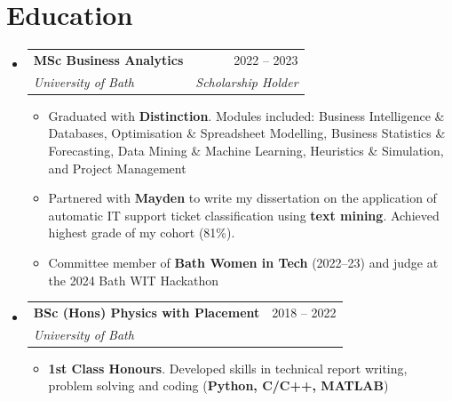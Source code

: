 \documentclass[a4paper,10pt]{article}
\makeatletter
\newcommand{\resumeItem}[1]{
  \item\small{#1}
}
\newcommand{\resumeItemListStart}{\begin{itemize}[rightmargin=0.11in, itemsep=2pt]}
\newcommand{\resumeItemListEnd}{\end{itemize}}
\newcommand{\resumeTrioHeading}[3]{
  \item\small{
    \begin{tabular*}{0.96\textwidth}[t]{
      l@{\extracolsep{\fill}}c@{\extracolsep{\fill}}r
    }
      \textbf{#1} & \textit{#2} & #3
    \end{tabular*}
  }
}
\newcommand{\resumeQuadHeading}[4]{
  \item
  \begin{tabular*}{0.96\textwidth}[t]{l@{\extracolsep{\fill}}r}
    \textbf{#1} & #2 \\
    \textit{\small#3} & \textit{\small #4} \\
  \end{tabular*}
}
\newcommand{\resumeHeadingListStart}{
  \begin{itemize}[leftmargin=0.15in, label={}, itemsep=2pt]
}
\newcommand{\resumeHeadingListEnd}{\end{itemize}}
\makeatother
\begin{document}

\section{Education}
  \resumeHeadingListStart{}
    \resumeQuadHeading{MSc Business Analytics}{2022 -- 2023}
    {University of Bath}{Scholarship Holder}
      \resumeItemListStart{}
        \resumeItem{Graduated with \textbf{Distinction}. Modules included: Business Intelligence \& Databases, Optimisation \& Spreadsheet Modelling, Business Statistics \& Forecasting, Data Mining \& Machine Learning, Heuristics \& Simulation, and Project Management}
        \resumeItem{Partnered with \textbf{Mayden} to write my dissertation on the application of automatic IT support ticket classification using \textbf{text mining}. Achieved highest grade of my cohort (81\%).}
        \resumeItem{Committee member of \textbf{Bath Women in Tech} (2022--23) and judge at the 2024 Bath WIT Hackathon}
      \resumeItemListEnd{}

    \resumeQuadHeading{BSc (Hons) Physics with Placement}{2018 -- 2022}
    {University of Bath}{}
      \resumeItemListStart{}
        \resumeItem{\textbf{1st Class Honours}. Developed skills in technical report writing, problem solving and coding (\textbf{Python, C/C++, MATLAB})}
      \resumeItemListEnd{}
  \resumeHeadingListEnd{}


%
\end{document}
